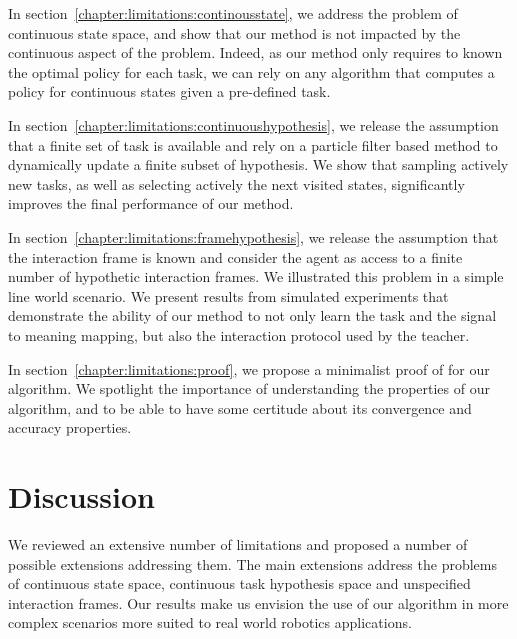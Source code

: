 In section~\ref{chapter:limitations:continousstate}, we address the problem of continuous state space, and show that our method is not impacted by the continuous aspect of the problem. Indeed, as our method only requires to known the optimal policy for each task, we can rely on any algorithm that computes a policy for continuous states given a pre-defined task.

In section~\ref{chapter:limitations:continuoushypothesis}, we release the assumption that a finite set of task is available and rely on a particle filter based method to dynamically update a finite subset of hypothesis. We show that sampling actively new tasks, as well as selecting actively the next visited states, significantly improves the final performance of our method.

In section~\ref{chapter:limitations:framehypothesis}, we release the assumption that the interaction frame is known and consider the agent as access to a finite number of hypothetic interaction frames. We illustrated this problem in a simple line world scenario. We present results from simulated experiments that demonstrate the ability of our method to not only learn the task and the signal to meaning mapping, but also the interaction protocol used by the teacher.

In section~\ref{chapter:limitations:proof}, we propose a minimalist proof of for our algorithm. We spotlight the importance of understanding the properties of our algorithm, and to be able to have some certitude about its convergence and accuracy properties.


\newpage

\newpage

\newpage
% 

\newpage

\newpage

\newpage
% 

\newpage

\section{Discussion}
\label{chapter:limitations:discussion}

We reviewed an extensive number of limitations and proposed a number of possible extensions addressing them. The main extensions address the problems of continuous state space, continuous task hypothesis space and unspecified interaction frames. Our results make us envision the use of our algorithm in more complex scenarios more suited to real world robotics applications.
